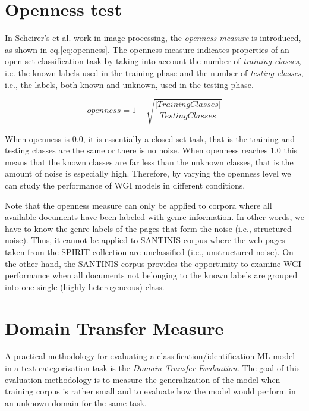 \section{Openness test}\label{chap:eval_mentods:sec:open_space_risk}

In Scheirer's et al. \citep{scheirer2013toward} work in image processing, the \textit{openness measure} is introduced, as shown in eq.\ref{eq:openness}. The openness measure indicates properties of an open-set classification task by taking into account the number of \textit{training classes}, i.e. the known labels used in the training phase and the number of \textit{testing classes}, i.e., the labels, both known and unknown, used in the testing phase.

\hfill \break

\begin{equation}\label{eq:openness}
	openness=1-\sqrt{\frac{ | Training Classes | }{ |Testing Classes | }}
\end{equation}

\hfill \break

When openness is $0.0$, it is essentially a closed-set task, that is the training and testing classes are the same or there is no noise. When openness reaches $1.0$ this means that the known classes are far less than the unknown classes, that is the amount of noise is especially high. Therefore, by varying the openness level we can study the performance of WGI models in different conditions.

Note that the openness measure can only be applied to corpora where all available documents have been labeled with genre information. In other words, we have to know the genre labels of the pages that form the noise (i.e., structured noise). Thus, it cannot be applied to SANTINIS corpus where the web pages taken from the SPIRIT collection are unclassified (i.e., unstructured noise). On the other hand, the SANTINIS corpus provides the opportunity to examine WGI performance when all documents not belonging to the known labels are grouped into one single (highly heterogeneous) class.

\section{Domain Transfer Measure}\label{chap:eval_mentods:sec:Closed_Set_Classification}
A practical methodology for evaluating a classification/identification ML model in a text-categorization task is the \textit{Domain Transfer Evaluation}. The goal of this evaluation methodology is to measure the generalization of the model when training corpus is rather small and to evaluate how the model would perform in an unknown domain for the same task. 

